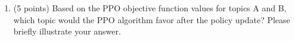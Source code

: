 \begin{enumerate}
\item (5 points)
Based on the PPO objective function values for topics A and B, which topic would the PPO algorithm favor after the policy update? Please briefly illustrate your answer.


\end{enumerate}


